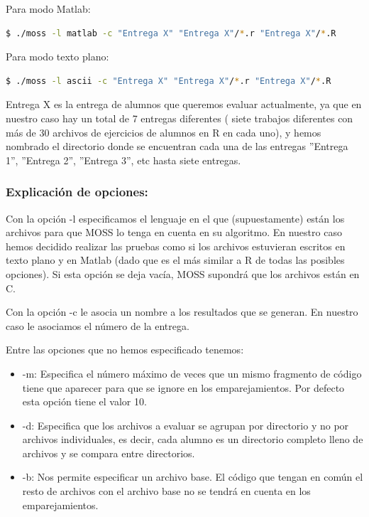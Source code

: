 \bigskip

Para modo Matlab:
\begin{center}
\begin{lstlisting}[language=bash]
$ ./moss -l matlab -c "Entrega X" "Entrega X"/*.r "Entrega X"/*.R
\end{lstlisting}
\end{center}


Para modo texto plano:
\begin{center}
\begin{lstlisting}[language=bash]
$ ./moss -l ascii -c "Entrega X" "Entrega X"/*.r "Entrega X"/*.R
\end{lstlisting}
\end{center}

Entrega X es la entrega de alumnos que queremos evaluar actualmente, ya que en nuestro caso hay un total de 7 entregas diferentes ( siete trabajos diferentes con más de 30 archivos de ejercicios de alumnos en R en cada uno), y hemos nombrado el directorio donde se encuentran cada una de las entregas ''Entrega 1'', ''Entrega 2'', ''Entrega 3'', etc hasta siete entregas.

\bigskip

\subsubsection{Explicación de opciones:}

Con la opción -l especificamos el lenguaje en el que (supuestamente) están los archivos para que MOSS lo tenga en cuenta en su algoritmo. En nuestro caso hemos decidido realizar las pruebas como si los archivos estuvieran escritos en texto plano y en Matlab (dado que es el más similar a R de todas las posibles opciones). Si esta opción se deja vacía, MOSS supondrá que los archivos están en C.

\bigskip

Con la opción -c le asocia un nombre a los resultados que se generan. En nuestro caso le asociamos el número de la entrega.

\bigskip

Entre las opciones que no hemos especificado tenemos:

\begin{itemize}
\item -m: Especifica el número máximo de veces que un mismo fragmento de código tiene que aparecer para que se ignore en los emparejamientos. Por defecto esta opción tiene el valor 10.
\item -d: Especifica que los archivos a evaluar se agrupan por directorio y no por archivos individuales, es decir, cada alumno es un directorio completo lleno de archivos y se compara entre directorios.
\item -b: Nos permite especificar un archivo base. El código que tengan en común el resto de archivos con el archivo base no se tendrá en cuenta en los emparejamientos.
\end{itemize}

